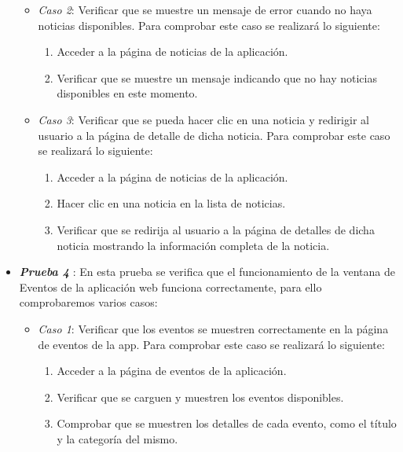 \begin{itemize}
    \begin{itemize}
        \item \textit{Caso 2}:
    Verificar que se muestre un mensaje de error cuando no haya noticias disponibles. Para comprobar este caso se realizará lo siguiente:
   \begin{enumerate}
       \item Acceder a la página de noticias de la aplicación.
       \item Verificar que se muestre un mensaje indicando que no hay noticias disponibles en este momento.
   \end{enumerate}
    \end{itemize}

    \begin{itemize}
        \item \textit{Caso 3}:
    Verificar que se pueda hacer clic en una noticia y redirigir al usuario a la página de detalle de dicha noticia. Para comprobar este caso se realizará lo siguiente:
   \begin{enumerate}
       \item Acceder a la página de noticias de la aplicación.
       \item Hacer clic en una noticia en la lista de noticias.
       \item Verificar que se redirija al usuario a la página de detalles de dicha noticia mostrando la información completa de la noticia.
   \end{enumerate}
    \end{itemize}

     \item \textbf{\textit{Prueba 4}} \label{Prueba4}: En esta prueba se verifica que el funcionamiento de la ventana de Eventos de la aplicación web funciona correctamente, para ello comprobaremos varios casos:

      \begin{itemize}
        \item \textit{Caso 1}:
    Verificar que los eventos se muestren correctamente en la página de eventos de la app. Para comprobar este caso se realizará lo siguiente:
   \begin{enumerate}
       \item Acceder a la página de eventos de la aplicación.
       \item Verificar que se carguen y muestren los eventos disponibles.
       \item Comprobar que se muestren los detalles de cada evento, como el título y la categoría del mismo.
   \end{enumerate}
    \end{itemize}


\end{itemize}
